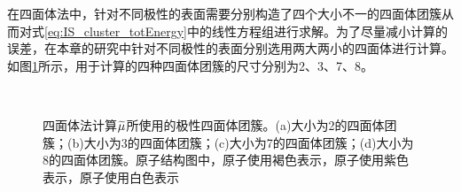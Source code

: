 在四面体法中，针对不同极性的表面需要分别构造了四个大小不一的四面体团簇从而对式\eqref{eq:IS_cluster_totEnergy}中的线性方程组进行求解。为了尽量减小计算的误差，在本章的研究中针对不同极性的表面分别选用两大两小的四面体进行计算。如图\ref{fig:IS_structure_cluster}所示，用于计算的四种四面体团簇的尺寸分别为2、3、7、8。

\begin{figure}[htb]
    \\
    \caption{四面体法计算$\it \widetilde{\mu}_{\rm }^{\rm } \it$所使用的极性四面体团簇。(a)大小为2的四面体团簇；(b)大小为3的四面体团簇；(c)大小为7的四面体团簇；(d)大小为8的四面体团簇。原子结构图中，原子使用褐色表示，原子使用紫色表示，原子使用白色表示}
    \label{fig:IS_structure_cluster}
\end{figure}

